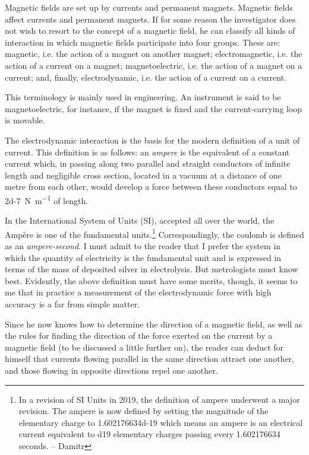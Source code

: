 Magnetic fields are set up by currents and permanent magnets. Magnetic fields affect currents and permanent magnets. If for some reason the investigator does not wish to resort to the concept of a magnetic field, he can classify all kinds of interaction in which magnetic fields participate into four groups. These are: magnetic, i.e. the action of a magnet on another magnet; electromagnetic, i.e. the action of a current on a magnet; magnetoelectric, i.e. the action of a magnet on a current; and, finally, electrodynamic, i.e. the action of a current on a current.\label{mag-interaction}

This terminology is mainly used in engineering. An instrument is said to be magnetoelectric, for instance, if the magnet is fixed and the current-carrying loop is movable.

The electrodynamic interaction is the basis for the modern definition of a unit of current. This definition is as follows: an \emph{ampere} is the equivalent of a constant current which, in passing along two parallel and straight conductors of infinite length and negligible cross section, located in a vacuum at a distance of one metre from each other, would develop a force between these conductors equal to \SI{2d-7}{\newton\per\metre} of length.\label{ampere-def}



In the International System of Units (SI), accepted all over the world, the Amp\`ere is one of the fundamental units.\footnote{In a revision of SI Units in 2019, the definition of ampere underwent a major revision. The ampere is now defined by setting the magnitude of the elementary charge to \num{1.602176634d-19} which means an ampere is an electrical current equivalent to \num{d19} elementary charges passing every \num{1.602176634} seconds. -- Damitr} Correspondingly, the coulomb is defined as an \emph{ampere-second}. I must admit to the reader that I prefer the system in which the quantity of electricity is the fundamental unit and is expressed in terms of the mass of deposited silver in electrolysis. But metrologists must know best. Evidently, the above definition must have some merits, though, it seems to me that in practice a measurement of the electrodynamic force with high accuracy is a far from simple matter.

Since he now knows how to determine the direction of a magnetic field, as well as the rules for finding the direction of the force exerted on the current by a magnetic field (to be discussed a little further on), the reader can deduct for himself that currents flowing parallel in the same direction attract one another, and those flowing in opposite directions repel one another.

